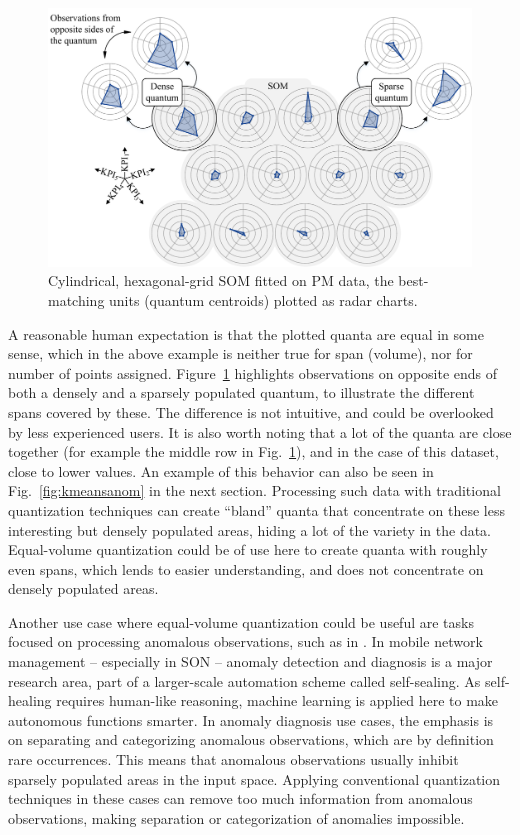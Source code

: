 			\begin{figure}[ht]
				\centering
				\includegraphics[width=\linewidth]{figures/03_quantization/som/som_pic.pdf}
				\caption[PM data exploration with a SOM]{Cylindrical, hexagonal-grid SOM fitted on PM data, the best-matching units (quantum centroids) plotted as radar charts.}
				\label{fig:som}
			\end{figure}
			
			A reasonable human expectation is that the plotted quanta are equal in some sense, which in the above example is neither true for span (volume), nor for number of points assigned.
			Figure~\ref{fig:som} highlights observations on opposite ends of both a densely and a sparsely populated quantum, to illustrate the different spans covered by these. 
			The difference is not intuitive, and could be overlooked by less experienced users.
			It is also worth noting that a lot of the quanta are close together (for example the middle row in Fig.~\ref{fig:som}), and in the case of this dataset, close to lower values.
			An example of this behavior can also be seen in Fig.~\ref{fig:kmeansanom} in the next section.
			Processing such data with traditional quantization techniques can create ``bland'' quanta that concentrate on these less interesting but densely populated areas, hiding a lot of the variety in the data.
			Equal-volume quantization could be of use here to create quanta with roughly even spans, which lends to easier understanding, and does not concentrate on densely populated areas.
			
			Another use case where equal-volume quantization could be useful are tasks focused on processing anomalous observations, such as in \cite{kumpulainen}.
			In mobile network management -- especially in \ac{SON} -- anomaly detection and diagnosis is a major research area, part of a larger-scale automation scheme called self-sealing.
			As self-healing requires human-like reasoning, machine learning is applied here to make autonomous functions smarter.
			In anomaly diagnosis use cases, the emphasis is on separating and categorizing anomalous observations, which are by definition rare occurrences.
			This means that anomalous observations usually inhibit sparsely populated areas in the input space.
			Applying conventional quantization techniques in these cases can remove too much information from anomalous observations, making separation or categorization of anomalies impossible.
			
